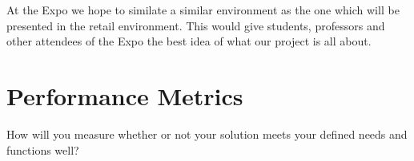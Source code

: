 \documentclass[letterpaper,10pt,titlepage]{article}
\begin{document}
At the Expo we hope to similate a similar environment as the one which will be presented in the retail environment. This would give students, professors and other attendees of the Expo the best idea of what our project is all about.

\section{Performance Metrics}
How will you measure whether or not your solution meets your defined needs and functions well?
\end{document}
